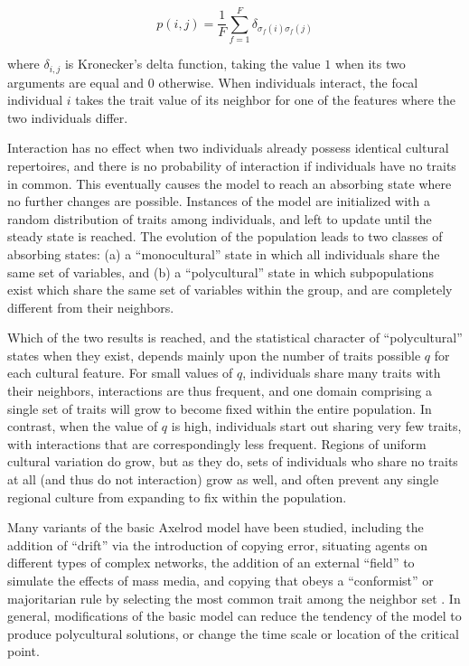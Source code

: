 \documentclass[referee,graybox,natbib]{svmult}
\begin{document}
\begin{equation}\label{eq:axelrod}p(i,j) = \frac{1}{F} \sum_{f=1}^{F} \delta_{\sigma_f(i)\sigma_f(j)}\end{equation}

where $\delta_{i,j}$ is Kronecker's delta function, taking the value $1$
when its two arguments are equal and $0$ otherwise. When individuals
interact, the focal individual $i$ takes the trait value of its neighbor
for one of the features where the two individuals differ.

Interaction has no effect when two individuals already possess identical
cultural repertoires, and there is no probability of interaction if
individuals have no traits in common. This eventually causes the model
to reach an absorbing state where no further changes are possible.
Instances of the model are initialized with a random distribution of
traits among individuals, and left to update until the steady state is
reached. The evolution of the population leads to two classes of
absorbing states: (a) a ``monocultural'' state in which all individuals
share the same set of variables, and (b) a ``polycultural'' state in
which subpopulations exist which share the same set of variables within
the group, and are completely different from their neighbors.

Which of the two results is reached, and the statistical character of
``polycultural'' states when they exist, depends mainly upon the number
of traits possible $q$ for each cultural feature. For small values of
$q$, individuals share many traits with their neighbors, interactions
are thus frequent, and one domain comprising a single set of traits will
grow to become fixed within the entire population. In contrast, when the
value of $q$ is high, individuals start out sharing very few traits,
with interactions that are correspondingly less frequent. Regions of
uniform cultural variation do grow, but as they do, sets of individuals
who share no traits at all (and thus do not interaction) grow as well,
and often prevent any single regional culture from expanding to fix
within the population.

Many variants of the basic Axelrod model have been studied, including
the addition of ``drift'' via the introduction of copying error,
situating agents on different types of complex networks, the addition of
an external ``field'' to simulate the effects of mass media, and copying
that obeys a ``conformist'' or majoritarian rule by selecting the most
common trait among the neighbor set
\citep{castellano2000nonequilibrium, de2009effects, flache2006sustains, GonzalezAvella:2007p6910, GonzalezAvella:2007p6912, gonzalez2005nonequilibrium, gonzalez2006local, Klemm:2003p7031, Klemm:2003p7112, Klemm:2005tb, Lanchier:2010p16999, Lanchier:2012ur}.
In general, modifications of the basic model can reduce the tendency of
the model to produce polycultural solutions, or change the time scale or
location of the critical point.
\end{document}
